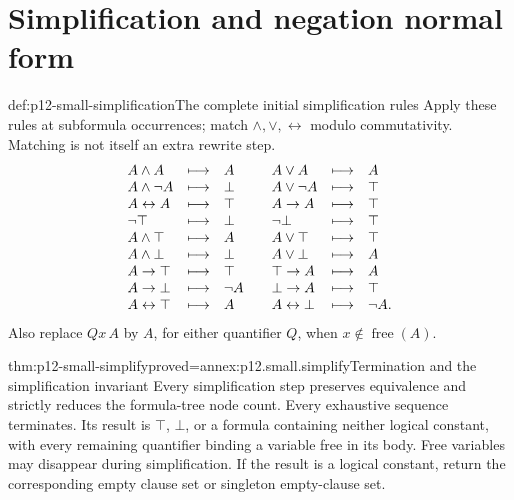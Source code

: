 \section{Simplification and negation normal form}

\begin{hbmethod}{def:p12-small-simplification}{The complete initial simplification rules}
Apply these rules at subformula occurrences; match
\(\land,\lor,\leftrightarrow\) modulo commutativity.
Matching is not itself an extra rewrite step.
\[
\begin{array}{lll@{\qquad}lll}
A\land A&\longmapsto&A&A\lor A&\longmapsto&A\\
A\land\neg A&\longmapsto&\bot&A\lor\neg A&\longmapsto&\top\\
A\leftrightarrow A&\longmapsto&\top&A\to A&\longmapsto&\top\\
\neg\top&\longmapsto&\bot&\neg\bot&\longmapsto&\top\\
A\land\top&\longmapsto&A&A\lor\top&\longmapsto&\top\\
A\land\bot&\longmapsto&\bot&A\lor\bot&\longmapsto&A\\
A\to\top&\longmapsto&\top&\top\to A&\longmapsto&A\\
A\to\bot&\longmapsto&\neg A&\bot\to A&\longmapsto&\top\\
A\leftrightarrow\top&\longmapsto&A&
A\leftrightarrow\bot&\longmapsto&\neg A .
\end{array}
\]
Also replace \(Qx\,A\) by \(A\), for either quantifier \(Q\),
when \(x\notin\operatorname{free}(A)\).
\end{hbmethod}

\begin{hbtheorem}{thm:p12-small-simplify}{proved=annex:p12.small.simplify}{Termination and the simplification invariant}
Every simplification step preserves equivalence and strictly reduces
the formula-tree node count. Every exhaustive sequence terminates.
Its result is \(\top\), \(\bot\), or a formula containing neither
logical constant, with every remaining quantifier binding a variable
free in its body. Free variables may disappear during simplification.
If the result is a logical constant, return the corresponding
empty clause set or singleton empty-clause set.
\end{hbtheorem}

